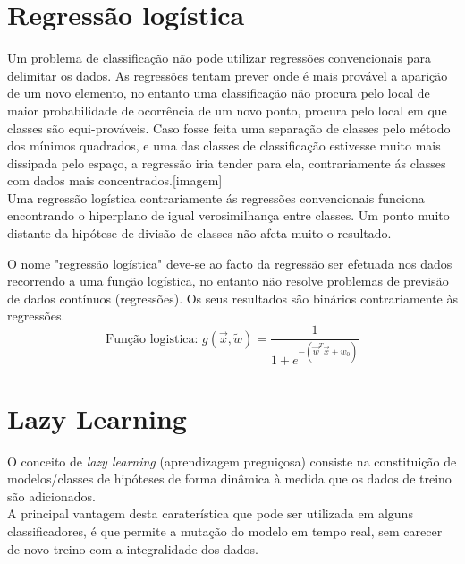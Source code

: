 \documentclass[]{report}
\begin{document}
\section{Regressão logística}
Um problema de classificação não pode utilizar regressões convencionais para delimitar os dados. As regressões tentam prever onde é mais provável a aparição de um novo elemento, no entanto uma classificação não procura pelo local de maior probabilidade de ocorrência de um novo ponto, procura pelo local em que classes são equi-prováveis. Caso fosse feita uma separação de classes pelo método dos mínimos quadrados, e uma das classes de classificação estivesse muito mais dissipada pelo espaço, a regressão iria tender para ela, contrariamente ás classes com dados mais concentrados.[imagem]\\
Uma regressão logística contrariamente ás regressões convencionais funciona encontrando o hiperplano de igual verosimilhança entre classes. Um ponto muito distante da hipótese de divisão de classes não afeta muito o resultado.\par
O nome "regressão logística" deve-se ao facto da regressão ser efetuada nos dados recorrendo a uma função logística, no entanto não resolve problemas de previsão de dados contínuos (regressões). Os seus resultados são binários contrariamente às regressões.
$$\text{Função logistica: } g(\vec x, \widetilde w) = \frac {1}{1+e^{-(\vec w ^T \vec x + w_0)}}$$
\section{Lazy Learning}
O conceito de \textit{lazy learning} (aprendizagem preguiçosa) consiste na constituição de modelos/classes de hipóteses de forma dinâmica à medida que os dados de treino são adicionados.\\
A principal vantagem desta caraterística que pode ser utilizada em alguns classificadores, é que permite a mutação do modelo em tempo real, sem carecer de novo treino com a integralidade dos dados.
\end{document}
